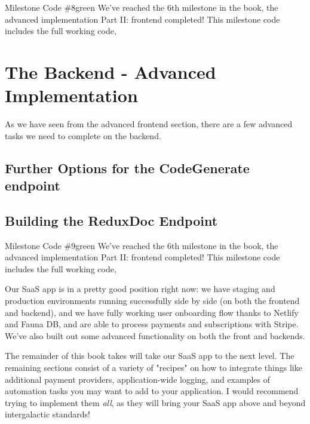 \documentclass[paper=6in:9in,pagesize=pdftex,headinclude=on,footinclude=on,12pt,twoside]{scrbook}
\begin{document}
\begin{highlightBox}{Milestone Code \#8}{green}{\greenCheck}
We've reached the 6th milestone in the book, the advanced implementation Part II: frontend completed! This milestone code includes the full working code, 
\end{highlightBox}

\chapter{The Backend - Advanced Implementation}

As we have seen from the advanced frontend section, there are a few advanced tasks we need to complete on the backend.

\section{Further Options for the CodeGenerate endpoint}

\section{Building the ReduxDoc Endpoint}

\begin{highlightBox}{Milestone Code \#9}{green}{\greenCheck}
We've reached the 6th milestone in the book, the advanced implementation Part II: frontend completed! This milestone code includes the full working code, 
\end{highlightBox}


Our SaaS app is in a pretty good position right now: we have staging and production environments running successfully side by side (on both the frontend and backend), and we have fully working user onboarding flow thanks to Netlify and Fauna DB, and are able to process payments and subscriptions with Stripe. We've also built out some advanced functionality on both the front and backends. 

The remainder of this book takes will take our SaaS app to the next level. The remaining sections consist of a variety of "recipes" on how to integrate things like additional payment providers, application-wide logging, and examples of automation tasks you may want to add to your application. I would recommend trying to implement them \textit{all}, as they will bring your SaaS app above and beyond intergalactic standards! \rocket
\end{document}
